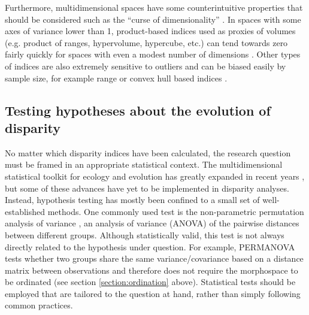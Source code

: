 \documentclass[12pt,letterpaper]{article}
\begin{document}
Furthermore, multidimensional spaces have some counterintuitive properties that should be considered such as the ``curse of dimensionality'' \citep{Bellman1966-mc}.
In spaces with some axes of variance lower than 1, product-based indices used as proxies of volumes (e.g. product of ranges, hypervolume, hypercube, etc.) can tend towards zero fairly quickly for spaces with even a modest number of dimensions \citep{Bellman1966-mc}.
Other types of indices are also extremely sensitive to outliers and can be biased easily by sample size, for example range \citep{Foote1992-zs} or convex hull based indices \citep{Jackson2011-kq}.

\subsection{Testing hypotheses about the evolution of disparity} \label{section:testing}

No matter which disparity indices have been calculated, the research question must be framed in an appropriate statistical context.
The multidimensional statistical toolkit for ecology and evolution has greatly expanded in recent years \citep{clavel2015mvmorph, Adams2018-mg}, but some of these advances have yet to be implemented in disparity analyses. Instead, hypothesis testing has mostly been confined to a small set of well-established methods.
One commonly used test is the non-parametric permutation analysis of variance \citep{Anderson2001-qb, Anderson2013-zt}, an analysis of variance (ANOVA) of the pairwise distances between different groups.
Although statistically valid, this test is not always directly related to the hypothesis under question.
For example, PERMANOVA tests whether two groups share the same variance/covariance based on a distance matrix between observations and therefore does not require the morphospace to be ordinated (see section \ref{section:ordination} above).
Statistical tests should be employed that are tailored to the question at hand, rather than simply following common practices.
\end{document}

